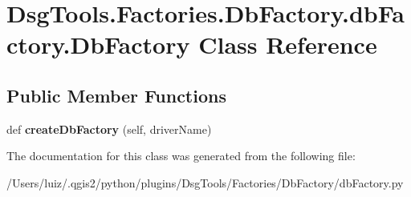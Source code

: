 \hypertarget{class_dsg_tools_1_1_factories_1_1_db_factory_1_1db_factory_1_1_db_factory}{}\section{Dsg\+Tools.\+Factories.\+Db\+Factory.\+db\+Factory.\+Db\+Factory Class Reference}
\label{class_dsg_tools_1_1_factories_1_1_db_factory_1_1db_factory_1_1_db_factory}
\subsection*{Public Member Functions}
\begin{DoxyCompactItemize}
\item 
\mbox{\label{class_dsg_tools_1_1_factories_1_1_db_factory_1_1db_factory_1_1_db_factory_aef5e9c19625299cde72f8d5b1ed93052}} 
def {\bfseries create\+Db\+Factory} (self, driver\+Name)
\end{DoxyCompactItemize}


The documentation for this class was generated from the following file\+:\begin{DoxyCompactItemize}
\item 
/\+Users/luiz/.\+qgis2/python/plugins/\+Dsg\+Tools/\+Factories/\+Db\+Factory/db\+Factory.\+py\end{DoxyCompactItemize}
